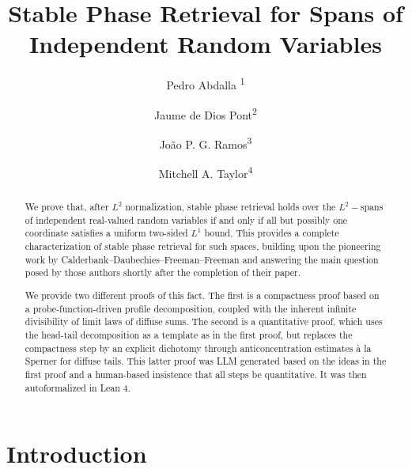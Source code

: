 \documentclass[11pt]{amsart}
\title[Stable Phase Retrieval for Independent Coordinates]{Stable Phase Retrieval for Spans of Independent Random Variables}
\author{Pedro Abdalla \textsuperscript{1}}
\author{Jaume de Dios Pont\textsuperscript{2}}
\author{Jo\~ao P. G. Ramos\textsuperscript{3}}
\author{Mitchell A. Taylor\textsuperscript{4}}
\numberwithin{equation}{section}
\theoremstyle{definition}
\theoremstyle{remark}
\begin{document}

\begin{abstract} We prove that, after $L^2$ normalization, stable phase retrieval
holds over the $L^2-$spans of independent real-valued random variables if and only if all but possibly one coordinate satisfies a uniform two-sided
$L^1$ bound. This provides a complete characterization of stable phase retrieval for such spaces, building upon the pioneering work by Calderbank--Daubechies--Freeman--Freeman and answering the main question posed by those authors shortly after the completion of their paper.

We provide two different proofs of this fact. The first is a compactness proof
based on a probe-function-driven profile decomposition, coupled with the inherent infinite divisibility of limit laws of diffuse sums. The second is a quantitative proof, which uses the head-tail decomposition as a template as in the first proof, but replaces the compactness step by an explicit dichotomy through anticoncentration estimates à la Sperner for diffuse tails. This latter proof was LLM generated based on the ideas in the first proof and a human-based insistence that all steps be quantitative. It was then autoformalized in Lean 4.
\end{abstract}

\maketitle
\begingroup
\renewcommand{\thefootnote}{\arabic{footnote}}
\endgroup
\setcounter{footnote}{0}

\section{Introduction}
\end{document}
